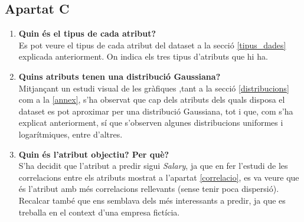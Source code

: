 \documentclass[a4paper, 11pt]{article}
\begin{document}
\subsection{Apartat C}
\begin{enumerate}
    \item \textbf{Quin és el tipus de cada atribut?}\\
    Es pot veure el tipus de cada atribut del dataset a la secció \textcolor{navy}{\ref{tipus_dades}} explicada anteriorment.
    On indica els tres tipus d'atributs que hi ha.
    \item \textbf{Quins atributs tenen una distribució Gaussiana?}\\
    Mitjançant un estudi visual de les gràfiques ,tant a la secció \textcolor{navy}{\ref{distribucions}} com a la \textcolor{navy}{\ref{annex}}, s'ha observat que cap dels atributs dels quals disposa el dataset es pot aproximar per una distribució Gaussiana, tot i que, com s'ha explicat anteriorment, sí que s'observen algunes distribucions uniformes i logarítmiques, entre d'altres.
    \item \textbf{Quin és l'atribut objectiu? Per què?}\\
    S'ha decidit que l'atribut a predir sigui \textit{Salary}, ja que en fer l'estudi de les correlacions entre els atributs mostrat a l'apartat \textcolor{navy}{\ref{correlacio}}, es va veure que és l'atribut amb més correlacions rellevants (sense tenir poca dispersió). Recalcar també que ens semblava dels més interessants a predir, ja que es treballa en el context d'una empresa fictícia.
\end{enumerate}


\newpage
\end{document}
